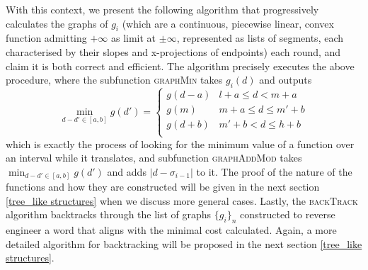 \documentclass[conference]{IEEEtran}
\newcounter{cases}
\begin{document}
With this context, we present the following algorithm that progressively calculates the graphs of $g_i$ (which are a continuous, piecewise linear, convex function admitting $+\infty$ as limit at $\pm\infty$, represented as lists of segments, each characterised by their slopes and x-projections of endpoints) each round, and claim it is both correct and efficient. 
The algorithm precisely executes the above procedure, where the subfunction \textsc{graphMin} takes $g_i(d)$ and outputs $$\min_{d-d' \in [a,b]} g(d') = \begin{cases}
	g(d-a) & l + a \leq d < m + a \\
	g(m) & m+a \leq d \leq m' + b \\
	g(d+b) & m' + b < d \leq h + b   \\
\end{cases}$$ which is exactly the process of looking for the minimum value of a function over an interval while it translates, and subfunction \textsc{graphAddMod} takes $\min_{d-d' \in [a,b]} g(d')$ and adds $|d - \sigma_{i-1}|$ to it. The proof of the nature of the functions and how they are constructed will be given in the next section \ref{tree_like structures} when we discuss more general cases. Lastly, the \textsc{backTrack} algorithm backtracks through the list of graphs $\{g_i\}_n$ constructed to reverse engineer a word that aligns with the minimal cost calculated. Again, a more detailed algorithm for backtracking will be proposed in the next section \ref{tree_like structures}. 
\end{document}
